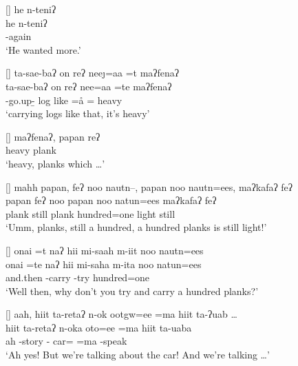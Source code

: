 \begin{exe}
[]{\glll
	he n-teniʔ \\
	he n-teniʔ \\
	{\he} \n-again \\
\glt `He wanted more.'}

[]{\glll
	ta-sae-baʔ  on reʔ nee\j=aa =t maʔfenaʔ \\
	ta-sae-baʔ  on reʔ nee=aa =te maʔfenaʔ \\
	\tg-go.up-{\b} log like {\reqt} {\nee=\aa} ={\te} heavy \\
\glt `carrying logs like that, it's heavy'}

\vspace{-4pt}
[]{\gll
	maʔfenaʔ, papan reʔ \\
	heavy plank {\req}\\
\glt `heavy, planks which {\ldots}'}

[]{\glll
	mahh papan, feʔ {noo nautn--,} papan noo nautn=ees, \hspace{20mm} maʔkafaʔ feʔ \\
	{} papan feʔ noo papan noo natun=ees {} maʔkafaʔ feʔ \\
	{} plank still {\manaq} plank {\manaq} hundred=one {} light still \\
\glt `Umm, planks, still a hundred, a hundred planks is still light!'}

[]{\glll
	{onai =t} naʔ hii mi-saah m-iit noo nautn=ees \\
	{onai =te} naʔ hii mi-saha m-ita noo natun=ees \\
	and.then {} {\hii} \mi-carry \m-try {\manaq} hundred=one \\
\glt `Well then, why don't you try and carry a hundred planks?'}


[]{\glll
	aah, hiit ta-retaʔ n-ok ootgw=ee =ma hiit ta-ʔuab {\ldots}\\
	{} hiit ta-retaʔ n-oka oto=ee =ma hiit ta-uaba \\
	ah {\hiit} {\ta}-story {\n-\ok} car={\ee} =ma {\hiit} {\ta}-speak \\
\glt `Ah yes! But we're talking about the car! And we're talking {\ldots}'}


\end{exe}
